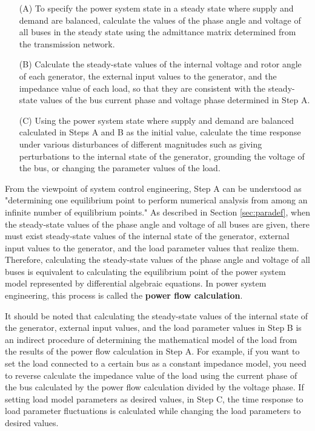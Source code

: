 \documentclass[graybox, envcountchap]{svmult}
\begin{document}
\medskip
\begin{breakbox}
\begin{itemize}
  \item[(A)] To specify the power system state in a steady state where supply and
  demand are balanced, calculate the values of the phase angle and voltage of all
  buses in the steady state using the admittance matrix determined from the
  transmission network.
  \item[(B)] Calculate the steady-state values of the internal voltage and rotor
  angle of each generator, the external input values to the generator, and the
  impedance value of each load, so that they are consistent with the steady-state
  values of the bus current phase and voltage phase determined in Step A.
  \item[(C)] Using the power system state where supply and demand are balanced
  calculated in Steps A and B as the initial value, calculate the time response
  under various disturbances of different magnitudes such as giving perturbations
  to the internal state of the generator, grounding the voltage of the bus, or
  changing the parameter values of the load.
\end{itemize}
\end{breakbox}
\medskip

From the viewpoint of system control engineering, Step A can be understood as
"determining one equilibrium point to perform numerical analysis from among an
infinite number of equilibrium points." As described in Section
\ref{sec:paradef}, when the steady-state values of the phase angle and voltage
of all buses are given, there must exist steady-state values of the internal
state of the generator, external input values to the generator, and the load
parameter values that realize them. Therefore, calculating the steady-state
values of the phase angle and voltage of all buses is equivalent to calculating
the equilibrium point of the power system model represented by differential
algebraic equations. In power system engineering, this process is called the
\textbf{power flow calculation}. 

It should be noted that calculating the steady-state values of the internal
state of the generator, external input values, and the load parameter values in
Step B is an indirect procedure of determining the mathematical model of the
load from the results of the power flow calculation in Step A.  For example, if
you want to set the load connected to a certain bus as a constant impedance
model, you need to reverse calculate the impedance value of the load using the
current phase of the bus calculated by the power flow calculation divided by the
voltage phase.  If setting load model parameters as desired values, in Step C,
the time response to load parameter fluctuations is calculated while changing
the load parameters to desired values. 
\end{document}
